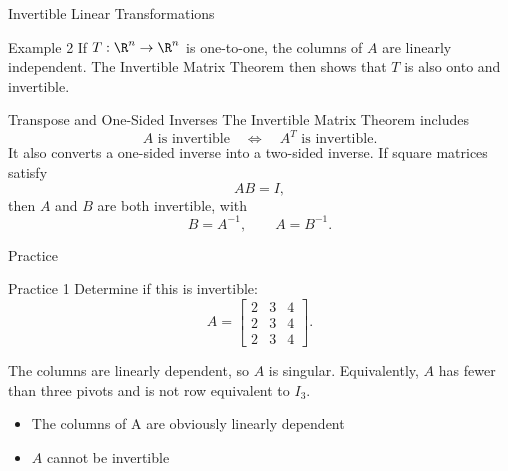 \begin{frame}{Invertible Linear Transformations}
\pause
\begin{block}{Example 2}
If $T:\R^n\to\R^n$ is one-to-one, the columns of $A$ are linearly independent. The Invertible Matrix Theorem then shows that $T$ is also onto and invertible.
\end{block}
\end{frame}

\begin{frame}{Transpose and One-Sided Inverses}
The Invertible Matrix Theorem includes
\[
A\text{ is invertible}\quad\Longleftrightarrow\quad A^T\text{ is invertible}.
\]
\pause
It also converts a one-sided inverse into a two-sided inverse. If square matrices satisfy
\[
AB=I,
\]
then $A$ and $B$ are both invertible, with
\[
B=A^{-1},\qquad A=B^{-1}.
\]
\end{frame}


\begin{frame}{Practice}

\begin{alertblock}{Practice 1}
  Determine if this is invertible:
  \[
A=\begin{bmatrix}
2&3&4\\2&3&4\\2&3&4
\end{bmatrix}.
\]
\end{alertblock}\pause
The columns are linearly dependent, so $A$ is singular. Equivalently, $A$ has fewer than three pivots and is not row equivalent to $I_3$.\pause
\begin{itemize}
  \item The columns of A are obviously linearly dependent\pause
  \item $A$ cannot be invertible
\end{itemize}
\end{frame}

